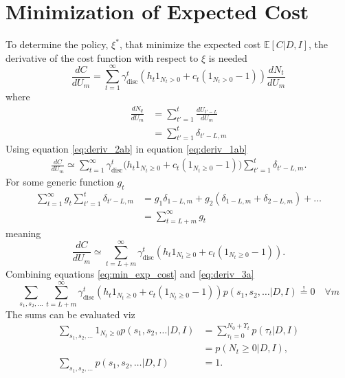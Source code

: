 \section{Minimization of Expected Cost}
\label{app:deriva}
To determine the policy, $\xi^*$, that minimize the expected cost $\mathbb{E}[C|D,I]$, the derivative of the cost function with respect to $\xi$ is needed
\begin{equation}
		\frac{dC}{dU_m} = \sum_{t=1}^{\infty} \gamma_{\text{disc}}^{t} \left( h_t 1_{N_t> 0} + c_t (1_{N_t> 0}-1) \right)\frac{dN_t}{dU_m}
	\label{eq:deriv_1ab}
\end{equation}
where
\begin{equation}
	\begin{split}
		\frac{dN_q}{dU_m} &= \sum_{t'=1}^t\frac{dU_{t'-L}}{dU_m}\\
		& = \sum_{t'=1}^t\delta_{t'-L,m}
	\label{eq:deriv_2ab}
	\end{split}
\end{equation}
Using equation \eqref{eq:deriv_2ab} in equation \eqref{eq:deriv_1ab} 
\begin{equation}
	\begin{split}
		\frac{dC}{dU_m} \simeq \sum_{t=1}^{\infty}\gamma_{\text{disc}}^{t}\bigg(h_t1_{N_t\geq 0}+c_t(1_{N_t\geq 0}-1)\bigg)\sum_{t'=1}^t\delta_{t'-L,m}.
	\end{split}
\end{equation}
For some generic function $g_t$
\begin{equation}
	\begin{split}
		\sum_{t=1}^{\infty}g_t\sum_{t'=1}^t\delta_{t'-L,m} & = g_1\delta_{1-L,m}+g_2(\delta_{1-L,m}+\delta_{2-L,m})+\dots\\
		&=\sum_{t=L+m}^\infty g_t
	\end{split}
\end{equation}
meaning
\begin{equation}
	\frac{dC}{dU_m} \simeq \sum_{t=L+m}^{\infty}\gamma_{\text{disc}}^{t}(h_t1_{N_t\geq 0}+c_t(1_{N_t\geq 0}-1)).
	\label{eq:deriv_3a}
\end{equation}
Combining equations \eqref{eq:min_exp_cost} and \eqref{eq:deriv_3a}
\begin{equation}
	\sum_{s_1,s_2,\dots}\sum_{t=L+m}^{\infty}\gamma_{\text{disc}}^{t}(h_t1_{N_{t}\geq 0}+c_t(1_{N_{t}\geq 0}-1))p(s_1,s_{2},\dots|D,I)\overset{!}{=} 0\quad \forall m
\end{equation}
The sums can be evaluated viz
\begin{equation}
	\begin{split}
		\sum_{s_1,s_2,\dots}1_{N_{t}\geq 0}p(s_1,s_{2},\dots|D,I) &= \sum_{\tau_t=0}^{N_0+\Upsilon_t}p(\tau_t|D,I)\\
		&= p(N_t\geq 0|D,I),\\
		\sum_{s_1,s_2,\dots}p(s_1,s_{2},\dots|D,I)&=1.\\
	\end{split}
\end{equation}
